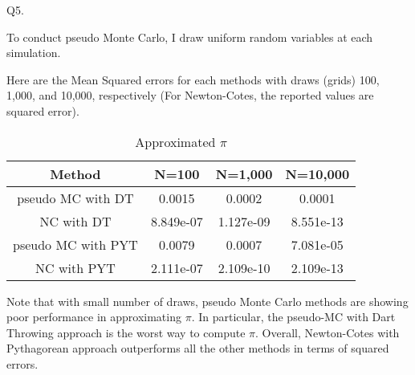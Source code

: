 \documentclass[10pt, letterpaper]{article}
\begin{document}
\noindent Q5. 

\noindent To conduct pseudo Monte Carlo, I draw uniform random variables at each simulation.  

Here are the Mean Squared errors for each methods with draws (grids) 100, 1,000, and 10,000, respectively (For Newton-Cotes, the reported values are squared error).

\begin{table}[h!]
  \begin{center}
    \caption{Approximated $\pi$}  
    \label{tab:estimate}
    \begin{tabular}{c|c|c|c} %
      \hline\hline
       Method                & N=100           &  N=1,000       &  N=10,000  \\
      \hline
       pseudo MC with DT     & 0.0015           &  0.0002       &  0.0001     \\
       NC with DT            & 8.849e-07        &  1.127e-09    &  8.551e-13    \\ 
       pseudo MC with PYT    & 0.0079           &  0.0007       &  7.081e-05  \\
       NC with PYT           & 2.111e-07        &  2.109e-10    &  2.109e-13 \\ 
      \hline      \hline
    \end{tabular}
  \end{center}
\end{table} 

Note that with small number of draws, pseudo Monte Carlo methods are showing poor performance in approximating $\pi$. In particular, the pseudo-MC with Dart Throwing approach is the worst way to compute $\pi$. Overall, Newton-Cotes with Pythagorean approach outperforms all the other methods in terms of squared errors. 

\clearpage
\end{document}

